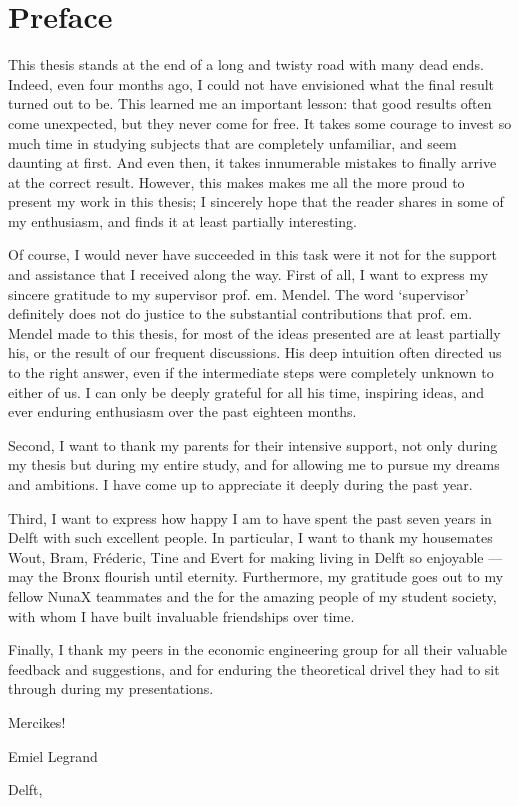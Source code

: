 \chapter{Preface}
\thispagestyle{empty}
This thesis stands at the end of a long and twisty road with many dead ends. Indeed, even four months ago, I could not have envisioned what the final result turned out to be. This learned me an important lesson: that good results often come unexpected, but they never come for free. It takes some courage to invest so much time in studying subjects that are completely unfamiliar, and seem daunting at first. And even then, it takes innumerable mistakes to finally arrive at the correct result. 
However, this makes makes me all the more proud to present my work in this thesis; I sincerely hope that the reader shares in some of my enthusiasm, and finds it at least partially interesting.

Of course, I would never have succeeded in this task were it not for the support and assistance that I received along the way. First of all, I want to express my sincere gratitude to my supervisor prof. em. Mendel. The word `supervisor' definitely does not do justice to the substantial contributions that prof. em. Mendel made to this thesis, for most of the ideas presented are at least partially his, or the result of our frequent discussions. His deep intuition often directed us to the right answer, even if the intermediate steps were completely unknown to either of us. I can only be deeply grateful for all his time, inspiring ideas, and ever enduring enthusiasm over the past eighteen months. 

Second, I want to thank my parents for their intensive support, not only during my thesis but during my entire study, and for allowing me to pursue my dreams and ambitions. I have come up to appreciate it deeply during the past year.

Third, I want to express how happy I am to have spent the past seven years in Delft with such excellent people. In particular, I want to thank my housemates Wout, Bram, Fréderic, Tine and Evert for making living in Delft so enjoyable --- may the Bronx flourish until eternity. Furthermore, my gratitude goes out to my fellow NunaX teammates and the for the amazing people of my student society, with whom I have built invaluable friendships over time.

Finally, I thank my peers in the economic engineering group for all their valuable feedback and suggestions, and for enduring the theoretical drivel they had to sit through during my presentations.

Mercikes!

\begin{flushright}
    Emiel Legrand
\end{flushright}
Delft, \mscdate



